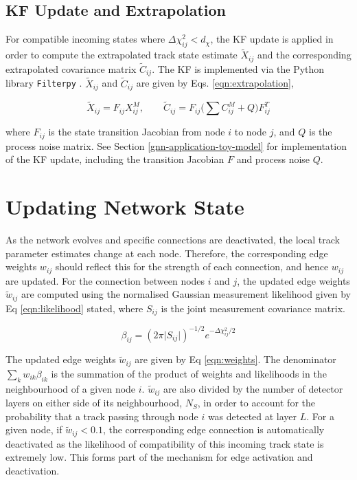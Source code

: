 \subsection{KF Update and Extrapolation}
\label{chapter-5-kf-extrapolation}

For compatible incoming states where $\Delta \chi^{2}_{ij} < d_{\chi}$, the KF update is applied in order to compute the extrapolated track state estimate $\tilde{X}_{ij}$ and the corresponding extrapolated covariance matrix $\widetilde{C}_{ij}$. The KF is implemented via the Python library \texttt{Filterpy} \cite{filterpy}. $\tilde{X}_{ij}$ and $\widetilde{C}_{ij}$ are given by Eqs. \eqref{eqn:extrapolation},

\begin{equation}
\tilde{X}_{ij} = F_{ij} X_{ij}^{M}, \qquad \tilde{C}_{ij} = F_{ij} \biggl( \sum C_{ij}^{M} + Q \biggl) F^{T}_{ij}
\label{eqn:extrapolation}
\end{equation}

where $F_{ij}$ is the state transition Jacobian from node $i$ to node $j$, and $Q$ is the process noise matrix. See Section \ref{gnn-application-toy-model} for implementation of the KF update, including the transition Jacobian $F$ and process noise $Q$. 






\section{Updating Network State}
\label{gnn-updating-network-state}

As the network evolves and specific connections are deactivated, the local track parameter estimates change at each node. Therefore, the corresponding edge weights $w_{ij}$ should reflect this for the strength of each connection, and hence $w_{ij}$ are updated. For the connection between nodes $i$ and $j$, the updated edge weights $\widetilde{w}_{ij}$ are computed using the normalised Gaussian measurement likelihood given by Eq \eqref{eqn:likelihood} stated, where $S_{ij}$ is the joint measurement covariance matrix.

\begin{equation}
\beta_{ij} = (2 \pi \lvert S_{ij} \rvert )^{-1/2}  e^{-\Delta \chi^{2}_{ij} / 2}
\label{eqn:likelihood}
\end{equation}


The updated edge weights $\widetilde{w}_{ij}$ are given by Eq \eqref{eqn:weights}. The denominator $\sum_{k}w_{ik}\beta_{ik}$ is the summation of the product of weights and likelihoods in the neighbourhood of a given node $i$. $\widetilde{w}_{ij}$ are also divided by the number of detector layers on either side of its neighbourhood, $N_S$, in order to account for the probability that a track passing through node $i$ was detected at layer $L$. For a given node, if $\widetilde{w}_{ij} < 0.1$, the corresponding edge connection is automatically deactivated as the likelihood of compatibility of this incoming track state is extremely low. This forms part of the mechanism for edge activation and deactivation.

